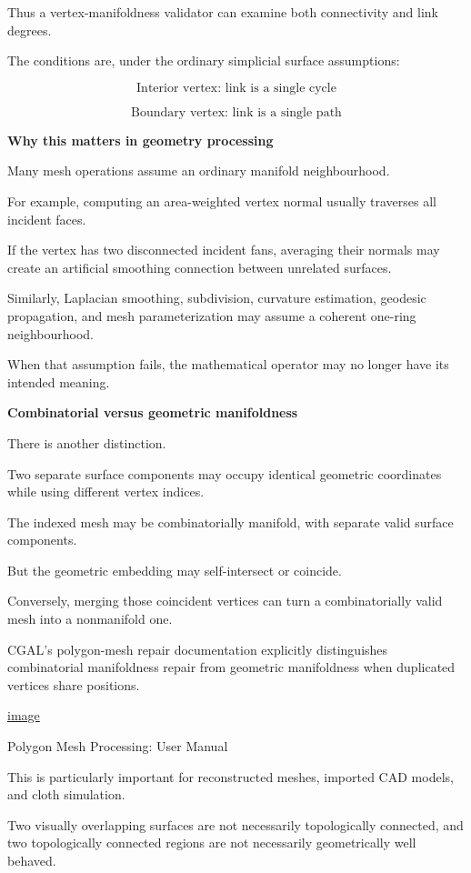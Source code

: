 Thus a vertex-manifoldness validator can examine both connectivity and link degrees.

The conditions are, under the ordinary simplicial surface assumptions:

\[
\boxed{ \text{Interior vertex: link is a single cycle} }
\]

\[
\boxed{ \text{Boundary vertex: link is a single path} }
\]

\textbf{Why this matters in geometry processing}

Many mesh operations assume an ordinary manifold neighbourhood.

For example, computing an area-weighted vertex normal usually traverses all incident faces.

If the vertex has two disconnected incident fans, averaging their normals may create an artificial smoothing connection between unrelated surfaces.

Similarly, Laplacian smoothing, subdivision, curvature estimation, geodesic propagation, and mesh parameterization may assume a coherent one-ring neighbourhood.

When that assumption fails, the mathematical operator may no longer have its intended meaning.

\textbf{Combinatorial versus geometric manifoldness}

There is another distinction.

Two separate surface components may occupy identical geometric coordinates while using different vertex indices.

The indexed mesh may be combinatorially manifold, with separate valid surface components.

But the geometric embedding may self-intersect or coincide.

Conversely, merging those coincident vertices can turn a combinatorially valid mesh into a nonmanifold one.

CGAL's polygon-mesh repair documentation explicitly distinguishes combinatorial manifoldness repair from geometric manifoldness when duplicated vertices share positions. 

\href{https://www.google.com/s2/favicons?domain=https://doc.cgal.org&sz=32}{image}

Polygon Mesh Processing: User Manual

This is particularly important for reconstructed meshes, imported CAD models, and cloth simulation.

Two visually overlapping surfaces are not necessarily topologically connected, and two topologically connected regions are not necessarily geometrically well behaved.

